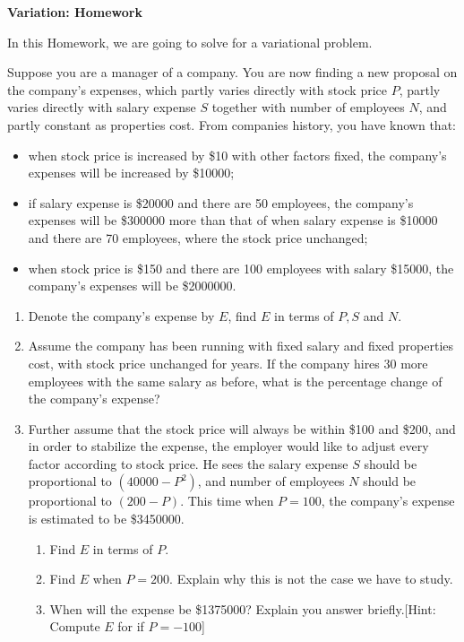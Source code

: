 \documentclass[12pt]{article}
\begin{document}
    \begin{center}
        \textbf{Variation: Homework}
    \end{center}

    In this Homework, we are going to solve for a variational problem.

    Suppose you are a manager of a company. You are now finding a new proposal on the company's expenses, which partly varies directly with stock price $P$, partly varies directly with salary expense $S$ together with number of employees $N$, and partly constant as properties cost. From companies history, you have known that:\begin{itemize}
        \item when stock price is increased by \$10 with other factors fixed, the company's expenses will be increased by \$10000;
        \item if salary expense is \$20000 and there are 50 employees, the company's expenses will be \$300000 more than that of when salary expense is \$10000 and there are 70 employees, where the stock price unchanged;
        \item when stock price is \$150 and there are 100 employees with salary \$15000, the company's expenses will be \$2000000.
    \end{itemize}

    \begin{enumerate}
        \item Denote the company's expense by $E$, find $E$ in terms of $P,S$ and $N$.
        \item Assume the company has been running with fixed salary and fixed properties cost, with stock price unchanged for years. If the company hires 30 more employees with the same salary as before, what is the percentage change of the company's expense?
        \item Further assume that the stock price will always be within \$100 and \$200, and in order to stabilize the expense, the employer would like to adjust every factor according to stock price. He sees the salary expense $S$ should be proportional to $(40000-P^2)$, and number of employees $N$ should be proportional to $(200-P)$. This time when $P=100$, the company's expense is estimated to be \$3450000.\begin{enumerate}
            \item Find $E$ in terms of $P$.
            \item Find $E$ when $P=200$. Explain why this is not the case we have to study.
            \item When will the expense be \$1375000? Explain you answer briefly.[Hint: Compute $E$ for if $P=-100$]
        \end{enumerate}
    \end{enumerate}
\end{document}

